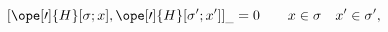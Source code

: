 \begin{equation}	\label{12.29new}
[ \ope[\prime]{H}[\sigma;x] , \ope[\prime]{H}[\sigma';x'] ]_{\_} = 0
\qquad	x\in\sigma
\quad	x'\in\sigma' ,
	\end{equation}

